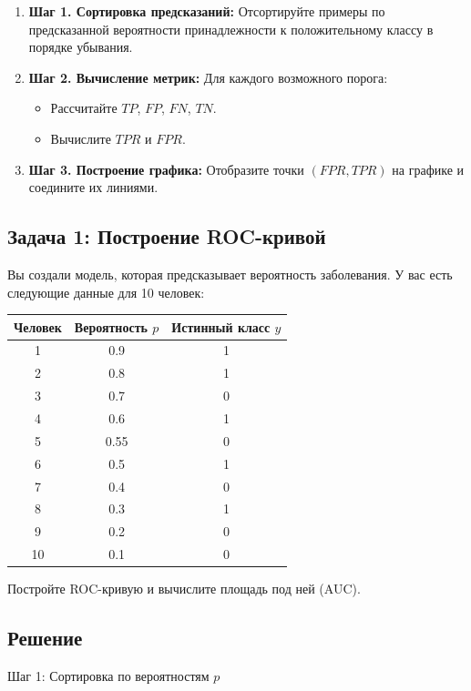 \begin{enumerate}
    \item \textbf{Шаг 1. Сортировка предсказаний:} Отсортируйте примеры по предсказанной вероятности принадлежности к положительному классу в порядке убывания.
    \item \textbf{Шаг 2. Вычисление метрик:} Для каждого возможного порога:
    \begin{itemize}
        \item Рассчитайте $TP$, $FP$, $FN$, $TN$.
        \item Вычислите $TPR$ и $FPR$.
    \end{itemize}
    \item \textbf{Шаг 3. Построение графика:} Отобразите точки $(FPR, TPR)$ на графике и соедините их линиями.
\end{enumerate}


\subsection*{Задача 1: Построение ROC-кривой}

Вы создали модель, которая предсказывает вероятность заболевания. У вас есть следующие данные для 10 человек:

\begin{table}[h!]
\centering
\begin{tabular}{|c|c|c|}
\hline
\textbf{Человек} & \textbf{Вероятность $p$} & \textbf{Истинный класс $y$} \\
\hline
1 & 0.9 & 1 \\
2 & 0.8 & 1 \\
3 & 0.7 & 0 \\
4 & 0.6 & 1 \\
5 & 0.55 & 0 \\
6 & 0.5 & 1 \\
7 & 0.4 & 0 \\
8 & 0.3 & 1 \\
9 & 0.2 & 0 \\
10 & 0.1 & 0 \\
\hline
\end{tabular}
\end{table}

Постройте ROC-кривую и вычислите площадь под ней (AUC).

\subsection*{Решение}

Шаг 1: Сортировка по вероятностям $p$

